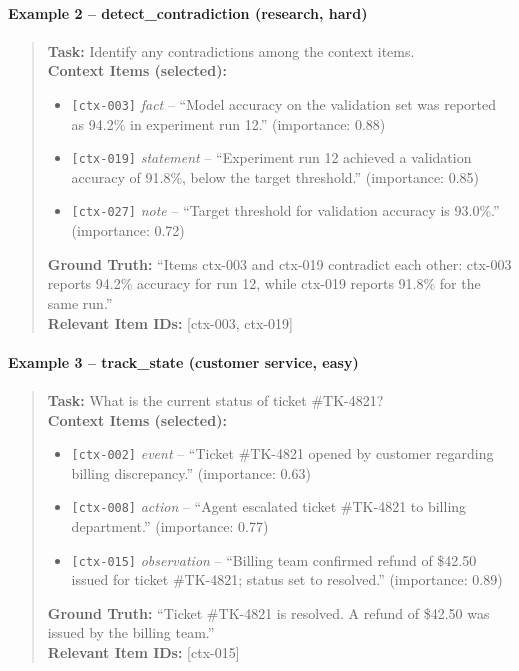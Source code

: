 \paragraph{Example 2 -- detect\_contradiction (research, hard)}
\begin{quote}
\small
\textbf{Task:} Identify any contradictions among the context items.\\[2pt]
\textbf{Context Items (selected):}
\begin{itemize}
  \item \texttt{[ctx-003]} \textit{fact} -- ``Model accuracy on the validation set was reported as 94.2\% in experiment run 12.'' (importance: 0.88)
  \item \texttt{[ctx-019]} \textit{statement} -- ``Experiment run 12 achieved a validation accuracy of 91.8\%, below the target threshold.'' (importance: 0.85)
  \item \texttt{[ctx-027]} \textit{note} -- ``Target threshold for validation accuracy is 93.0\%.'' (importance: 0.72)
\end{itemize}
\textbf{Ground Truth:} ``Items ctx-003 and ctx-019 contradict each other: ctx-003 reports 94.2\% accuracy for run 12, while ctx-019 reports 91.8\% for the same run.''\\[2pt]
\textbf{Relevant Item IDs:} [ctx-003, ctx-019]
\end{quote}

\paragraph{Example 3 -- track\_state (customer service, easy)}
\begin{quote}
\small
\textbf{Task:} What is the current status of ticket \#TK-4821?\\[2pt]
\textbf{Context Items (selected):}
\begin{itemize}
  \item \texttt{[ctx-002]} \textit{event} -- ``Ticket \#TK-4821 opened by customer regarding billing discrepancy.'' (importance: 0.63)
  \item \texttt{[ctx-008]} \textit{action} -- ``Agent escalated ticket \#TK-4821 to billing department.'' (importance: 0.77)
  \item \texttt{[ctx-015]} \textit{observation} -- ``Billing team confirmed refund of \$42.50 issued for ticket \#TK-4821; status set to resolved.'' (importance: 0.89)
\end{itemize}
\textbf{Ground Truth:} ``Ticket \#TK-4821 is resolved. A refund of \$42.50 was issued by the billing team.''\\[2pt]
\textbf{Relevant Item IDs:} [ctx-015]
\end{quote}

